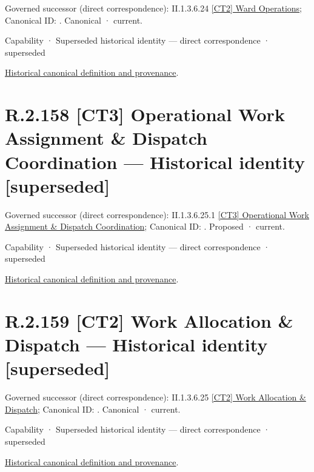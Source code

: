 {\small Governed successor (direct correspondence): II.1.3.6.24 \hyperref[element:f996ecca728f4942a88b034aca818a99]{[CT2] Ward Operations}; Canonical ID: \texttt{}. Canonical · current.}\par
\label{element:bf3d2e3581f24beda20a6a3a3348460e}
{\small Capability · Superseded historical identity — direct correspondence · superseded}\par
\href{../../../../continuum/strategy/capability/bf3d2e3581f24beda20a6a3a3348460e.md}{Historical canonical definition and provenance}.\par
\section*{R.2.158 [CT3] Operational Work Assignment \& Dispatch Coordination — Historical identity [superseded]}
\label{navigation:R.2.158}

{\small Governed successor (direct correspondence): II.1.3.6.25.1 \hyperref[element:3b58935cfa974176989c3c75d76a00fe]{[CT3] Operational Work Assignment \& Dispatch Coordination}; Canonical ID: \texttt{}. Proposed · current.}\par
\label{element:b42afda9e876463ba56fa8f73fe7a32a}
{\small Capability · Superseded historical identity — direct correspondence · superseded}\par
\href{../../../../continuum/strategy/capability/b42afda9e876463ba56fa8f73fe7a32a.md}{Historical canonical definition and provenance}.\par
\section*{R.2.159 [CT2] Work Allocation \& Dispatch — Historical identity [superseded]}
\label{navigation:R.2.159}

{\small Governed successor (direct correspondence): II.1.3.6.25 \hyperref[element:152a5252952c405994e9b171234efcb0]{[CT2] Work Allocation \& Dispatch}; Canonical ID: \texttt{}. Canonical · current.}\par
\label{element:f8c13b6f74b840cc96fbeada5865455a}
{\small Capability · Superseded historical identity — direct correspondence · superseded}\par
\href{../../../../continuum/strategy/capability/f8c13b6f74b840cc96fbeada5865455a.md}{Historical canonical definition and provenance}.\par
